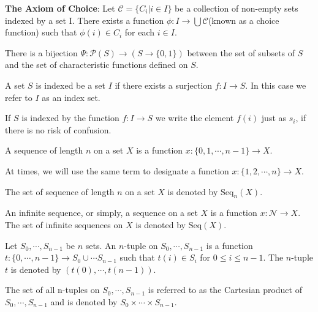 \documentclass[../main.tex]{subfiles}
\begin{document}
\begin{green}
\textbf{The Axiom of Choice}: Let $\mathcal{C}=\{C_i|i\in I\}$ be a collection of non-empty sets indexed by a set I. There exists a function $\phi: I\rightarrow\bigcup\mathcal{C}$(known as a choice function) such that $\phi(i)\in C_i$ for each $i\in I$.
\end{green}

\begin{yellow}
\begin{theorem}
There is a bijection $\Psi:\mathcal{P}(S)\rightarrow(S\rightarrow\{0,1\})$ between the set of subsets of $S$ and the set of characteristic functions defined on $S$.
\end{theorem}
\end{yellow}

\begin{purple}
\begin{definition}
A set $S$ is indexed be a set $I$ if there exists a surjection $f:I\rightarrow S$. In this case we refer to $I$ as an index set.

If $S$ is indexed by the function $f: I\rightarrow S$ we write the element $f(i)$ just as $s_i$, if there is no risk of confusion.
\end{definition}
\end{purple}

\begin{purple}
\begin{definition}
A sequence of length $n$ on a set $X$ is a function $x:\{0,1,\cdots,n-1\}\rightarrow X$.

At times, we will use the same term to designate a function $x:\{1,2,\cdots,n\}\rightarrow X$.

The set of sequence of length $n$ on a set $X$ is denoted by $\text{Seq}_n(X)$.

An infinite sequence, or simply, a sequence on a set $X$ is a function $x:\mathcal{N}\rightarrow X$. The set of infinite sequences on $X$ is denoted by $\text{Seq}(X)$.

Let $S_0,\cdots,S_{n-1}$ be $n$ sets. An $n$-tuple on $S_0,\cdots, S_{n-1}$ is a function $t:\{0,\cdots,n-1\}\rightarrow S_0\cup\cdots S_{n-1}$ such that $t(i)\in S_i$ for $0\le i\le n-1$. The $n$-tuple $t$ is denoted by $(t(0),\cdots,t(n-1))$.

The set of all n-tuples on $S_0,\cdots,S_{n-1}$ is referred to as the Cartesian product of $S_0,\cdots, S_{n-1}$ and is denoted by $S_0\times \cdots\times S_{n-1}$.
\end{definition}
\end{purple}
\end{document}
